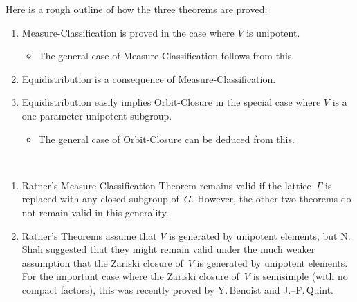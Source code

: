 \begin{rem}
Here is a rough outline of how the three theorems are proved:
	\begin{enumerate}
	\item Measure-Classification is proved in the case where $V$ is unipotent.
		\begin{itemize}
		\item The general case of Measure-Classification follows from this.
		\end{itemize}
	\item Equidistribution is a consequence of Measure-Classification.
	\item Equidistribution easily implies Orbit-Closure in the special case where $V$ is a one-parameter unipotent subgroup.
		\begin{itemize}
		\item The general case of Orbit-Closure can be deduced from this.
		\end{itemize}
	\end{enumerate}
\end{rem}

\begin{rems} \label{MeasClassRems} \ 
\noprelistbreak
	\begin{enumerate}
	\item Ratner's Measure-Classification Theorem  remains valid if the lattice~$\Gamma$ is replaced with any closed subgroup of~$G$. However, the other two theorems do not remain valid in this generality.

	\item \label{MeasClassRems-BenoistQuint}
Ratner's Theorems assume that $V$ is generated by unipotent elements, but
N.\,Shah suggested that they might remain valid under the much weaker assumption that the Zariski closure of~$V$ is generated by unipotent elements. For the important case where the Zariski closure of~$V$ is semisimple (with no compact factors), this was recently proved by Y.\,Benoist and J.--F.\,Quint.
	\end{enumerate}
\end{rems}

